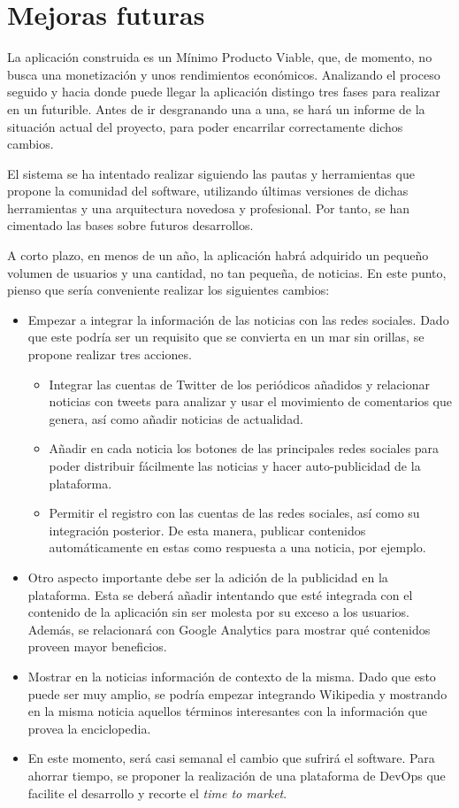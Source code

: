 \section{Mejoras futuras}\label{sec:mejoras_futuras}

La aplicación construida es un Mínimo Producto Viable, que, de momento, no busca una monetización y unos rendimientos económicos. Analizando el proceso seguido y hacia donde puede llegar la aplicación distingo tres fases para realizar en un futurible. Antes de ir desgranando una a una, se hará un informe de la situación actual del proyecto, para poder encarrilar correctamente dichos cambios.

El sistema se ha intentado realizar siguiendo las pautas y herramientas que propone la comunidad del software, utilizando últimas versiones de dichas herramientas y una arquitectura novedosa y profesional. Por tanto, se han cimentado las bases sobre futuros desarrollos.

A corto plazo, en menos de un año, la aplicación habrá adquirido un pequeño volumen de usuarios y una cantidad, no tan pequeña, de noticias. En este punto, pienso que sería conveniente realizar los siguientes cambios:

\begin{itemize}
    \item Empezar a integrar la información de las noticias con las redes sociales. Dado que este podría ser un requisito que se convierta en un mar sin orillas, se propone realizar tres acciones.
    \begin{itemize}
        \item Integrar las cuentas de Twitter de los periódicos añadidos y relacionar noticias con tweets para analizar y usar el movimiento de comentarios que genera, así como añadir noticias de actualidad.
        \item Añadir en cada noticia los botones de las principales redes sociales para poder distribuir fácilmente las noticias y hacer auto-publicidad de la plataforma.
        \item Permitir el registro con las cuentas de las redes sociales, así como su integración posterior. De esta manera, publicar contenidos automáticamente en estas como respuesta a una noticia, por ejemplo.
    \end{itemize}
    \item Otro aspecto importante debe ser la adición de la publicidad en la plataforma. Esta se deberá añadir intentando que esté integrada con el contenido de la aplicación sin ser molesta por su exceso a los usuarios. Además, se relacionará con Google Analytics para mostrar qué contenidos proveen mayor beneficios.
    \item Mostrar en la noticias información de contexto de la misma. Dado que esto puede ser muy amplio, se podría empezar integrando Wikipedia y mostrando en la misma noticia aquellos términos interesantes con la información que provea la enciclopedia.
    \item En este momento, será casi semanal el cambio que sufrirá el software. Para ahorrar tiempo, se proponer la realización de una plataforma de DevOps que facilite el desarrollo y recorte el \textit{time to market}.
\end{itemize}

